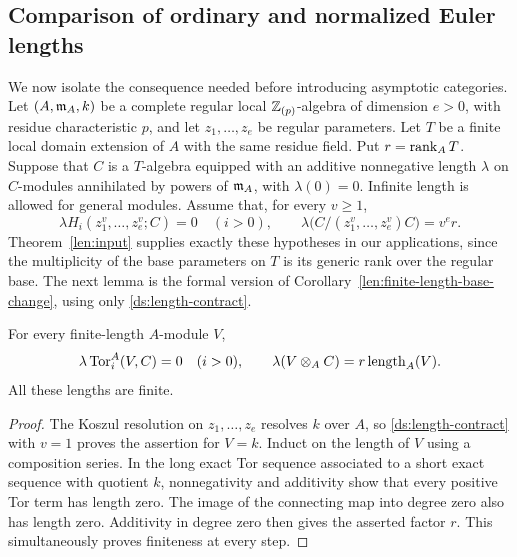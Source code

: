 \subsection{Comparison of ordinary and normalized Euler lengths}

We now isolate the consequence needed before introducing asymptotic
categories. Let $(A,\mathfrak{m}_A,k)$ be a complete regular local
$\mathbb{Z}_{(p)}$-algebra of dimension $e>0$, with residue characteristic
$p$, and let $z_1,\ldots,z_e$ be regular parameters. Let $T$ be a
finite local domain extension of $A$ with the same residue field.
Put $r=\operatorname{rank}_A T$. Suppose that $C$ is a $T$-algebra equipped with
an additive nonnegative length $\lambda$ on $C$-modules annihilated
by powers of $\mathfrak{m}_A$, with $\lambda(0)=0$. Infinite length is
allowed for general modules. Assume that, for every $v\geq1$,
\begin{equation}
 \lambda H_i(z_1^v,\ldots,z_e^v;C)=0\quad(i>0),
 \qquad
 \lambda\bigl(C/(z_1^v,\ldots,z_e^v)C\bigr)=v^e r.
 \label{ds:length-contract}
\end{equation}
Theorem~\ref{len:input} supplies exactly these hypotheses in our
applications, since the multiplicity of the base parameters on
$T$ is its generic rank over the regular base.
The next lemma is the formal version of
Corollary~\ref{len:finite-length-base-change}, using only
\eqref{ds:length-contract}.

\begin{lemma}
\label{ds:finite-length-basechange}
For every finite-length $A$-module $V$,
\begin{equation}
 \lambda\operatorname{Tor}_i^A(V,C)=0\quad(i>0),
 \qquad
 \lambda(V\otimes_A C)=r\operatorname{length}_A(V).
 \label{ds:finite-length-formula}
\end{equation}
All these lengths are finite.
\end{lemma}

\begin{proof}
The Koszul resolution on $z_1,\ldots,z_e$ resolves $k$ over
$A$, so \eqref{ds:length-contract} with $v=1$ proves the
assertion for $V=k$. Induct on the length of $V$ using a
composition series. In the long exact Tor sequence associated to
a short exact sequence with quotient $k$, nonnegativity and
additivity show that every positive Tor term has length zero.
The image of the connecting map into degree zero also has length
zero. Additivity in degree zero then gives the asserted factor
$r$. This simultaneously proves finiteness at every step.
\end{proof}

